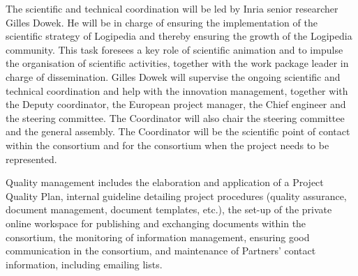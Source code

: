 \begin{workpackage}[id=management,type=MGT,wphases=1-48,
  short=Management,
  title=Management,
  InrRM=44,
  lead=Inr]
\begin{tasklist}
  \begin{task}[id=coordination,title=Scientific and technical coordination,shorttitle=Sci.\&tech.,lead=Inr,InrRM=20,wphases=1-48]
    The scientific and technical coordination will be led by Inria
    senior researcher Gilles Dowek. He will be in charge of ensuring
    the implementation of the scientific strategy of Logipedia and
    thereby ensuring the growth of the Logipedia community. This task
    foresees a key role of scientific animation and to impulse the
    organisation of scientific activities, together with the work package
    leader
    in charge of dissemination. Gilles Dowek will supervise the
    ongoing scientific and technical coordination and help with the
    innovation management, together with the Deputy coordinator,
    the European project manager, 
    the
    Chief engineer and the steering committee. The
    Coordinator will also chair the steering committee and the general
    assembly. The Coordinator will be the scientific point of contact
    within the consortium and for the consortium when the project
    needs to be represented.
  \end{task}


  \begin{task}[id=quality,title=Quality management,shorttitle=Sci.\&tech.,lead=Inr,InrRM=5,wphases=1-48]
Quality management includes
the elaboration and application of a Project Quality Plan, internal
  guideline detailing project procedures (quality assurance, document
  management, document templates, etc.),
the 
  set-up of the private online workspace for publishing and exchanging
  documents within the consortium, 
the
  monitoring of information management, ensuring good communication
  in the consortium,
and 
  maintenance of Partners’ contact information, including emailing lists.
\end{task}


\end{tasklist}
\end{workpackage}
